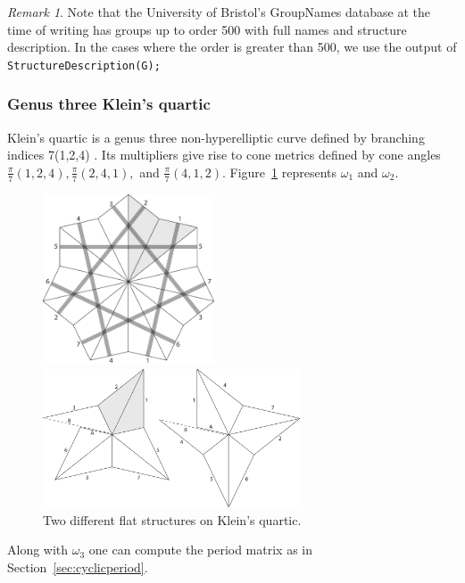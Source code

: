 \documentclass[12pt,reqno]{amsart}
\theoremstyle{definition}
\theoremstyle{remark}
\newtheorem*{remark}{Remark}
\begin{document}
\begin{remark} Note that the University of Bristol's GroupNames database at the time of writing has groups up to order 500 with full names and structure description. In the cases where the order is greater than 500, we use the output of \texttt{StructureDescription(G);} \end{remark}

\subsubsection{Genus three Klein's quartic}
Klein's quartic is a genus three non-hyperelliptic curve defined by branching indices 7(1,2,4) \cite{kw}. Its multipliers give rise to cone metrics defined by cone angles $\frac{\pi}{7}(1,2,4), \frac{\pi}{7}(2,4,1),$ and $\frac{\pi}{7}(4,1,2).$ Figure~\ref{fig:124} represents $\omega_1$ and $\omega_2.$

\begin{figure}[htbp] 
\centering
\begin{minipage}{0.5\textwidth}
	\centering
	\includegraphics[width=2in]{figures/124_flat.pdf}
\end{minipage}%
\begin{minipage}{0.5\textwidth}
	\centering
	\includegraphics[width=3in]{figures/124_flat_2.pdf}
\end{minipage}
	\caption{Two different flat structures on Klein's quartic.}
	\label{fig:124}
\end{figure}

Along with $\omega_3$ one can compute the period matrix as in Section~\ref{sec:cyclicperiod}.
\end{document}
